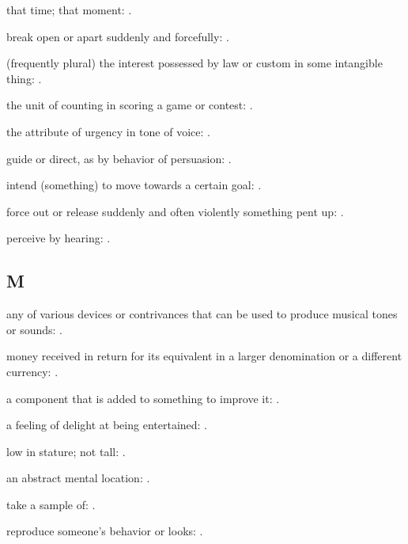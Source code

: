   that time; that moment: .

  break open or apart suddenly and forcefully:   .

  (frequently plural) the interest possessed by law or custom in some intangible thing: .

  the unit of counting in scoring a game or contest: .

  the attribute of urgency in tone of voice:   .

  guide or direct, as by behavior of persuasion: .

  intend (something) to move towards a certain goal:   .

  force out or release suddenly and often violently something pent up:   .

  perceive by hearing:   .

\subsection*{M}

  any of various devices or contrivances that can be used to produce musical tones or sounds:   .

  money received in return for its equivalent in a larger denomination or a different currency: .

  a component that is added to something to improve it:   .

  a feeling of delight at being entertained: .

  low in stature; not tall:   .

  an abstract mental location: .

  take a sample of:   .

  reproduce someone's behavior or looks:   .

